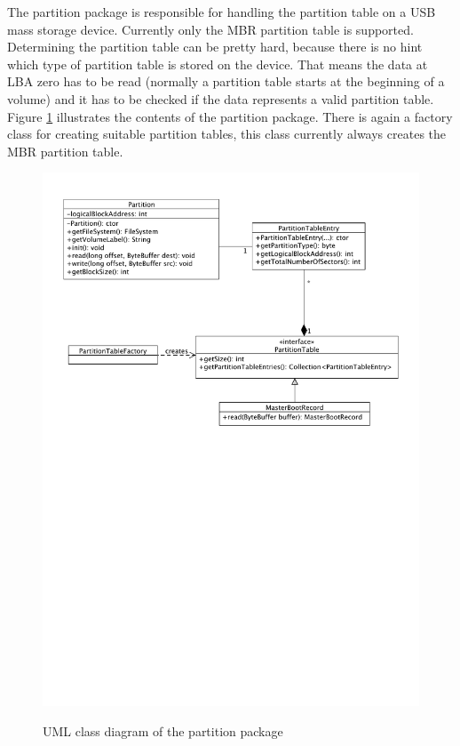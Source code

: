 The partition package is responsible for handling the partition table on a USB mass storage device. Currently only the MBR partition table is supported. Determining the partition table can be pretty hard, because there is no hint which type of partition table is stored on the device. That means the data at LBA zero has to be read (normally a partition table starts at the beginning of a volume) and it has to be checked if the data represents a valid partition table. Figure \ref{figure:partition_package} illustrates the contents of the partition package. There is again a factory class for creating suitable partition tables, this class currently always creates the MBR partition table.

\begin{figure}[h!]
\caption{UML class diagram of the partition package}
\centering
\includegraphics[scale=0.85]{figures/partition_package}
\label{figure:partition_package}
\end{figure}


